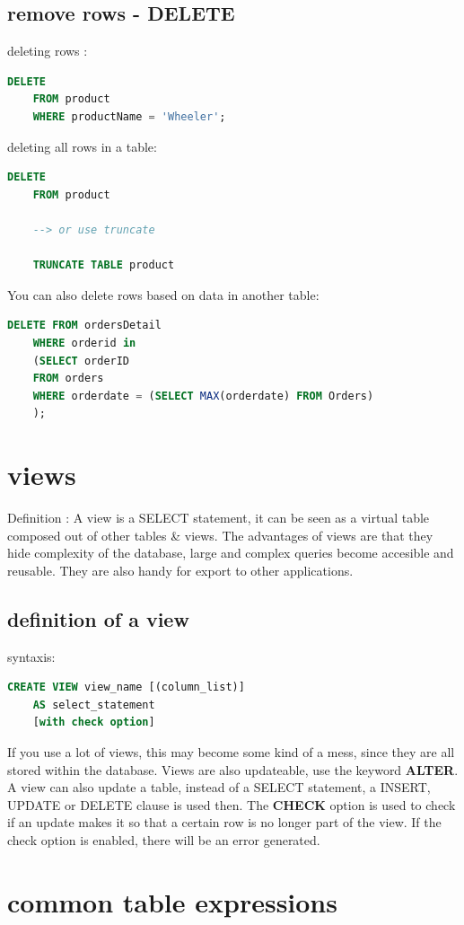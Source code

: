 \documentclass{report}
\begin{document}
	\subsection{remove rows - DELETE}
	deleting rows : 
	\begin{lstlisting}[language=SQL]
	DELETE
	FROM product
	WHERE productName = 'Wheeler';\end{lstlisting}
	deleting all rows in a table: 
	\begin{lstlisting}[language=SQL]
	DELETE
	FROM product
	
	--> or use truncate
	
	TRUNCATE TABLE product		\end{lstlisting} 
	You can also delete rows based on data in another table: 
	\begin{lstlisting}[language=SQL]
	DELETE FROM ordersDetail
	WHERE orderid in 
	(SELECT orderID 
	FROM orders
	WHERE orderdate = (SELECT MAX(orderdate) FROM Orders)
	);\end{lstlisting}
	
	\section{views}
	Definition : A view is a SELECT statement, it can be seen as a virtual table composed out of other tables \& views. The advantages of views are that they hide complexity of the database, large and complex queries become accesible and reusable. They are also handy for export to other applications.
	\subsection{definition of a view}
	syntaxis: 
	\begin{lstlisting}[language=sql]
	CREATE VIEW view_name [(column_list)]
	AS select_statement
	[with check option]\end{lstlisting}
	If you use a lot of views, this may become some kind of a mess, since they are all stored within the database. Views are also updateable, use the keyword \textbf{ALTER}.
	A view can also update a table, instead of a SELECT statement, a INSERT, UPDATE or DELETE clause is used then. The \textbf{CHECK} option is used to check if an update makes it so that a certain row is no longer part of the view. If the check option is enabled, there will be an error generated.
	
	\section{common table expressions}
\end{document}
